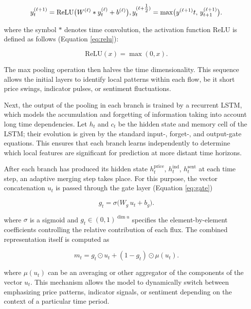\begin{equation}\label{eq:relu_pooling}
    y^{(\ell+1)}_{t} = \mathrm{ReLU}\bigl(W^{(\ell)} * y^{(\ell)}_{t} + b^{(\ell)}\bigr), \\
    y^{(\ell+\tfrac12)}_{t} = \max\bigl(y^{(\ell+1)}{t},\,y^{(\ell+1)}_{t+1}\bigr).
\end{equation}

where the symbol $*$ denotes time convolution, the activation function $\mathrm{ReLU}$ is defined as follows
(Equation \ref{eq:relu}):

\begin{equation}\label{eq:relu}
    \mathrm{ReLU}(x)=\max(0, x).
\end{equation}

The max pooling operation then halves the time dimensionality. This sequence allows the initial layers to identify
local patterns within each flow, be it short price swings, indicator pulses, or sentiment fluctuations.

Next, the output of the pooling in each branch is trained by a recurrent LSTM, which models the accumulation
and forgetting of information taking into account long time dependencies. Let $h_t$ and $c_t$ be the hidden state
and memory cell of the LSTM; their evolution is given by the standard input-, forget-, and output-gate equations.
This ensures that each branch learns independently to determine which local features are significant for prediction
at more distant time horizons.

After each branch has produced its hidden state $h_t^{\mathrm{price}}$, $h_t^{\mathrm{ind}}$, $h_t^{\mathrm{sent}}$
at each time step, an adaptive merging step takes place. For this purpose, the vector concatenation $u_t$ is passed
through the gate layer (Equation \ref{eq:gate})

\begin{equation}\label{eq:gate}
    g_t = \sigma\bigl(W_g\,u_t + b_g\bigr).
\end{equation}

where $\sigma$ is a sigmoid and $g_t\in(0,1)^{\dim u}$ specifies the element-by-element coefficients controlling
the relative contribution of each flux. The combined representation itself is computed as

\begin{equation}
    m_t = g_t\odot u_t + (1-g_t)\odot\mu(u_t).
\end{equation}

where $\mu(u_t)$ can be an averaging or other aggregator of the components of the vector $u_t$. This mechanism
allows the model to dynamically switch between emphasizing price patterns, indicator signals, or sentiment
depending on the context of a particular time period.

